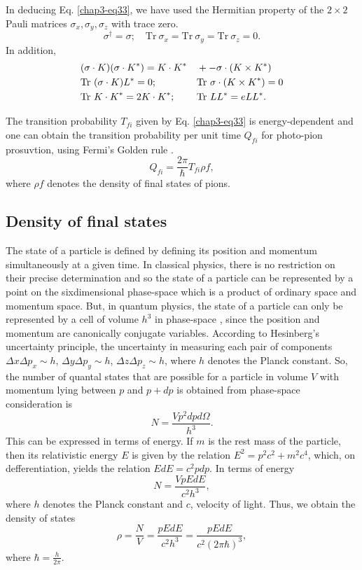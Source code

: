 In deducing Eq. \eqref{chap3-eq33}, we have used the Hermitian property of the $2 \times 2$ Pauli matrices $\sigma_x, \sigma_y, \sigma_z$ with trace zero.
$$
\sigma^\dagger = \sigma; \quad \text{Tr}~ \sigma_x = \text{Tr}~ \sigma_y = \text{Tr}~ \sigma_z =0.
$$
In addition,
\begin{alignat*}{3}
  &({\boldmath  \sigma \cdot K}) ({\boldmath  \sigma \cdot K}^\ast) = {\boldmath  K \cdot K}^\ast && + - {\boldmath  \sigma \cdot (K \times K^\ast)}\\
  & \text{Tr}~  ({\boldmath  \sigma \cdot K})L^\ast =0; && \text{Tr}~ \sigma \cdot ({\boldmath  K \times K}^\ast)=0\\
  & \text{Tr}~ {\boldmath  K \cdot K}^\ast = 2 {\boldmath  K \cdot K}^\ast; & &\text{Tr}~LL^\ast = e LL^\ast.
\end{alignat*}

The transition probability $T_{fi}$ given by Eq. \eqref{chap3-eq33} is energy-dependent and one can obtain the transition probability per unit time $Q_{fi}$ for photo-pion prosuvtion, using Fermi's Golden rule \cite{key23}.
\begin{equation}
  Q_{fi}= \frac{2 \pi}{\hbar} T_{fi} \rho f, \label{chap3-eq34}
\end{equation}
where $\rho f$ denotes the density of final states of pions.

\subsection{Density of final states}\label{chap3-sec4.1}

The state of a particle is defined by defining its position and momentum simultaneously at a given time. In classical physics, there is no restriction on their precise determination and so the state of a particle can be represented by a point on the sixdimensional phase-space which is a product of ordinary space and momentum space. But, in quantum physics, the state of a particle can only be represented by a cell of volume $h^3$ in phase-space \cite{key24}, since the position and momentum are canonically conjugate variables. According to Hesinberg’s uncertainty principle, the uncertainty in measuring each pair of components $\Delta x \Delta p_x \sim h$, $\Delta y \Delta p_y \sim h$, $\Delta z \Delta p_z \sim h$, where $h$ denotes the Planck constant. So, the number of quantal states that are possible for a particle in volume $V$ with momentum lying between $p$ and $p + dp$ is obtained from phase-space consideration \cite{key24} is
$$
N = \frac{Vp^2 dpd\Omega}{h^3}.
$$
This can be expressed in terms of energy. If $m$ is the rest mass of the particle, then its relativistic energy $E$ is given by the relation $E^2= p^2 c^2+ m^2 c^4$, which, on defferentiation, yields the relation $EdE=c^2pdp$. In terms of energy
$$
N= \frac{Vp{EdE}}{c^2 h^3},
$$
where $h$ denotes the Planck constant and $c$, velocity of light. Thus, we obtain the density of states
$$
\rho = \frac{N}{V} = \frac{p{EdE}}{c^2 h^3} = \frac{p{EdE}}{c^2 (2\pi \hbar)^3},
$$
where $\hbar = \tfrac{h}{2\pi}$.

